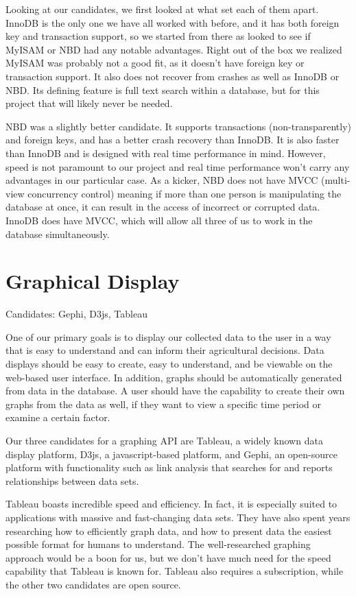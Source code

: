 \documentclass[letterpaper,10pt,titlepage]{article}
\begin{document}
Looking at our candidates, we first looked at what set each of them apart. InnoDB is the only one we have all worked with before, and it has both foreign key and transaction support, so we started from there as looked to see if MyISAM or NBD had any notable advantages. Right out of the box we realized MyISAM was probably not a good fit, as it doesn’t have foreign key or transaction support. It also does not recover from crashes as well as InnoDB or NBD. Its defining feature is full text search within a database, but for this project that will likely never be needed.

NBD was a slightly better candidate. It supports transactions (non-transparently) and foreign keys, and has a better crash recovery than InnoDB. It is also faster than InnoDB and is designed with real time performance in mind. However, speed is not paramount to our project and real time performance won’t carry any advantages in our particular case. As a kicker, NBD does not have MVCC (multi-view concurrency control) meaning if more than one person is manipulating the database at once, it can result in the access of incorrect or corrupted data. InnoDB does have MVCC, which will allow all three of us to work in the database simultaneously.

\section{Graphical Display}

Candidates: Gephi, D3js, Tableau

One of our primary goals is to display our collected data to the user in a way that is easy to understand and can inform their agricultural decisions. Data displays should be easy to create, easy to understand, and be viewable on the web-based user interface. In addition, graphs should be automatically generated from data in the database. A user should have the capability to create their own graphs from the data as well, if they want to view a specific time period or examine a certain factor. 

Our three candidates for a graphing API are Tableau, a widely known data display platform, D3js, a javascript-based platform, and Gephi, an open-source platform with functionality such as link analysis that searches for and reports relationships between data sets. 

Tableau boasts incredible speed and efficiency. In fact, it is especially suited to applications with massive and fast-changing data sets. They have also spent years researching how to efficiently graph data, and how to present data the easiest possible format for humans to understand. The well-researched graphing approach would be a boon for us, but we don’t have much need for the speed capability that Tableau is known for. Tableau also requires a subscription, while the other two candidates are open source. 
\end{document}
